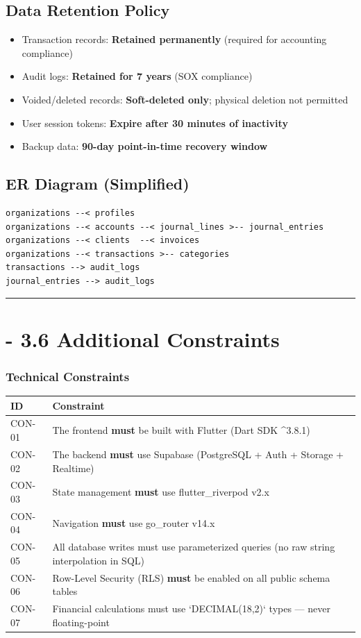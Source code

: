\documentclass[journal, a4paper, onecolumn, 12pt]{IEEEtran}
\begin{document}
\subsection{Data Retention Policy}
\begin{itemize}[leftmargin=*]
\item Transaction records: \textbf{Retained permanently} (required for accounting compliance)
\item Audit logs: \textbf{Retained for 7 years} (SOX compliance)
\item Voided/deleted records: \textbf{Soft-deleted only}; physical deletion not permitted
\item User session tokens: \textbf{Expire after 30 minutes of inactivity}
\item Backup data: \textbf{90-day point-in-time recovery window}
\end{itemize}

\subsection{ER Diagram (Simplified)}

\begin{verbatim}
organizations --< profiles
organizations --< accounts --< journal_lines >-- journal_entries
organizations --< clients  --< invoices
organizations --< transactions >-- categories
transactions --> audit_logs
journal_entries --> audit_logs
\end{verbatim}

\vspace{1em}\hrule\vspace{1em}

\section{    - 3.6 Additional Constraints}

\subsubsection{Technical Constraints}
\begin{longtable}{|p{}|p{}|}
\hline
ID & Constraint \\ \hline
\hline
CON-01 & The frontend \textbf{must} be built with Flutter (Dart SDK ^3.8.1) \\ \hline
CON-02 & The backend \textbf{must} use Supabase (PostgreSQL + Auth + Storage + Realtime) \\ \hline
CON-03 & State management \textbf{must} use flutter\_riverpod v2.x \\ \hline
CON-04 & Navigation \textbf{must} use go\_router v14.x \\ \hline
CON-05 & All database writes must use parameterized queries (no raw string interpolation in SQL) \\ \hline
CON-06 & Row-Level Security (RLS) \textbf{must} be enabled on all public schema tables \\ \hline
CON-07 & Financial calculations must use `DECIMAL(18,2)` types — never floating-point \\ \hline
\end{longtable}
\end{document}
